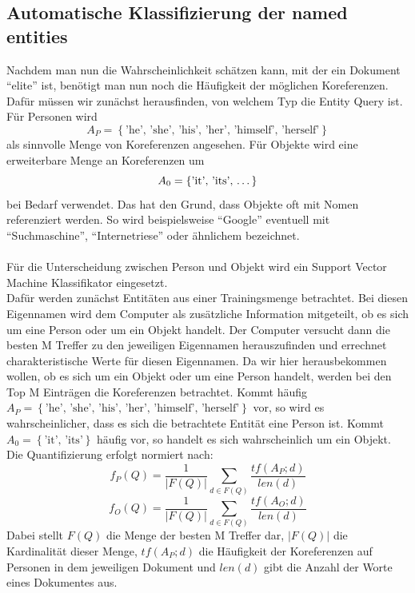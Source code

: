 \subsection{Automatische Klassifizierung der named entities}
Nachdem man nun die Wahrscheinlichkeit schätzen kann, mit der ein Dokument ``elite'' ist, benötigt man nun noch die Häufigkeit der möglichen Koreferenzen.\\
Dafür müssen wir zunächst herausfinden, von welchem Typ die Entity Query ist. Für Personen wird
\[A_P=\left\{ \text{'he', 'she', 'his', 'her', 'himself', 'herself'} \right\}\]
als sinnvolle Menge von Koreferenzen angesehen. Für Objekte wird eine erweiterbare Menge an Koreferenzen um
\[A_0=\left\{ \text{'it', 'its', \dots} \right\}\]
bei Bedarf verwendet. Das hat den Grund, dass Objekte oft mit Nomen referenziert werden. So wird beispielsweise ``Google'' eventuell mit ``Suchmaschine'', ``Internetriese'' oder ähnlichem bezeichnet.\\
\\
Für die Unterscheidung zwischen Person und Objekt wird ein Support Vector Machine Klassifikator eingesetzt.\\
Dafür werden zunächst Entitäten aus einer Trainingsmenge betrachtet. Bei diesen Eigennamen wird dem Computer als zusätzliche Information mitgeteilt, ob es sich um eine Person oder um ein Objekt handelt. Der Computer versucht dann die besten M Treffer zu den jeweiligen Eigennamen herauszufinden und errechnet charakteristische Werte für diesen Eigennamen. Da wir hier herausbekommen wollen, ob es sich um ein Objekt oder um eine Person handelt, werden bei den Top M Einträgen die Koreferenzen betrachtet. Kommt häufig $A_P=\left\{ \text{'he', 'she', 'his', 'her', 'himself', 'herself'} \right\}$ vor, so wird es wahrscheinlicher, dass es sich die betrachtete Entität eine Person ist. Kommt $A_0=\left\{ \text{'it', 'its'} \right\}$ häufig vor, so handelt es sich wahrscheinlich um ein Objekt. Die Quantifizierung erfolgt normiert nach:
\[f_P\left( Q \right)=\frac{1}{|F\left( Q \right)|}\sum_{d\in F\left( Q \right)} \frac{tf\left( A_P;d \right)}{len \left( d \right)}\]
\[f_O\left( Q \right)=\frac{1}{|F\left( Q \right)|}\sum_{d\in F\left( Q \right)} \frac{tf\left( A_O;d \right)}{len \left( d \right)}\]
Dabei stellt $F\left( Q \right)$ die Menge der besten M Treffer dar, $|F\left( Q \right)|$ die Kardinalität dieser Menge, $tf\left( A_P;d \right)$ die Häufigkeit der Koreferenzen auf Personen in dem jeweiligen Dokument und $len\left( d \right)$ gibt die Anzahl der Worte eines Dokumentes aus.\\
